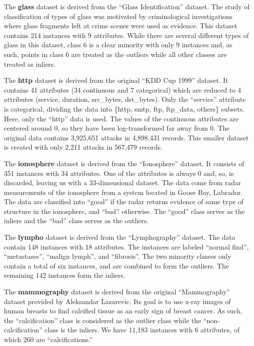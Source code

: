 \documentclass{article}
\begin{document}
The \textbf{glass} dataset is derived from the ``Glass Identification'' dataset.
The study of classification of types of glass was motivated by criminological investigations where glass fragments left at crime scenes were used as evidence.
This dataset contains 214 instances with 9 attributes.
While there are several different types of glass in this dataset, class 6 is a clear minority with only 9 instances and, as such, points in class 6 are treated as the outliers while all other classes are treated as inliers.

The \textbf{http} dataset is derived from the original ``KDD Cup 1999'' dataset.
It contains 41 attributes (34 continuous and 7 categorical) which are reduced to 4 attributes (service, duration, src\_bytes, dst\_bytes).
Only the ``service'' attribute is categorical, dividing the data into \{http, smtp, ftp, ftp\_data, others\} subsets.
Here, only the ``http'' data is used.
The values of the continuous attributes are centered around 0, so they have been log-transformed far away from 0.
The original data contains 3,925,651 attacks in 4,898,431 records.
This smaller dataset is created with only 2,211 attacks in 567,479 records.

The \textbf{ionosphere} dataset is derived from the ``Ionosphere'' dataset.
It consists of 351 instances with 34 attributes.
One of the attributes is always 0 and, so, is discarded, leaving us with a 33-dimensional dataset.
The data come from radar measurements of the ionosphere from a system located in Goose Bay, Labrador.
The data are classified into ``good'' if the radar returns evidence of some type of structure in the ionosphere, and ``bad'' otherwise.
The ``good'' class serves as the inliers and the ``bad'' class serves as the outliers.

The \textbf{lympho} dataset is derived from the ``Lymphography'' dataset.
The data contain 148 instances with 18 attributes.
The instances are labeled ``normal find'', ``metastases'', ``malign lymph'', and ``fibrosis''.
The two minority classes only contain a total of six instances, and are combined to form the outliers.
The remaining 142 instances form the inliers.

The \textbf{mammography} dataset is derived from the original ``Mammography'' dataset provided by Aleksandar Lazarevic.
Its goal is to use x-ray images of human breasts to find calcified tissue as an early sign of breast cancer.
As such, the ``calcification'' class is considered as the outlier class while the ``non-calcification'' class is the inliers.
We have 11,183 instances with 6 attributes, of which 260 are ``calcifications.''
\end{document}
